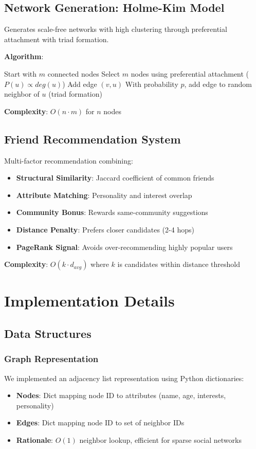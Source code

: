 \documentclass[12pt,a4paper]{article}
\begin{document}
\subsection{Network Generation: Holme-Kim Model}
Generates scale-free networks with high clustering through preferential attachment with triad formation.

\textbf{Algorithm}:
\begin{algorithmic}[1]
\State Start with $m$ connected nodes
    \State Select $m$ nodes using preferential attachment ($P(u) \propto deg(u)$)
        \State Add edge $(v, u)$
        \State With probability $p$, add edge to random neighbor of $u$ (triad formation)
    \EndFor
\EndFor
\end{algorithmic}

\textbf{Complexity}: $O(n \cdot m)$ for $n$ nodes

\subsection{Friend Recommendation System}
Multi-factor recommendation combining:
\begin{itemize}
    \item \textbf{Structural Similarity}: Jaccard coefficient of common friends
    \item \textbf{Attribute Matching}: Personality and interest overlap
    \item \textbf{Community Bonus}: Rewards same-community suggestions
    \item \textbf{Distance Penalty}: Prefers closer candidates (2-4 hops)
    \item \textbf{PageRank Signal}: Avoids over-recommending highly popular users
\end{itemize}

\textbf{Complexity}: $O(k \cdot d_{avg})$ where $k$ is candidates within distance threshold

\section{Implementation Details}

\subsection{Data Structures}

\subsubsection{Graph Representation}
We implemented an adjacency list representation using Python dictionaries:
\begin{itemize}
    \item \textbf{Nodes}: Dict mapping node ID to attributes (name, age, interests, personality)
    \item \textbf{Edges}: Dict mapping node ID to set of neighbor IDs
    \item \textbf{Rationale}: $O(1)$ neighbor lookup, efficient for sparse social networks
\end{itemize}
\end{document}
